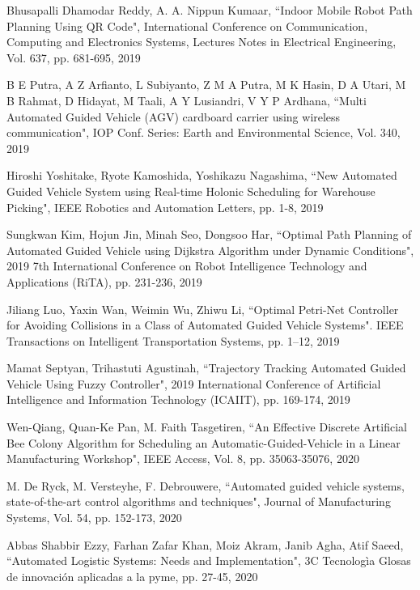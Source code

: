 \begin{thebibliography}{}
 Bhusapalli Dhamodar Reddy, A. A. Nippun Kumaar, ``Indoor Mobile Robot Path Planning Using QR Code", International Conference on Communication, Computing and Electronics Systems, Lectures Notes in Electrical Engineering, Vol. 637, pp. 681-695, 2019

 B E Putra, A Z Arfianto, L Subiyanto, Z M A Putra, M K Hasin, D A Utari, M B Rahmat, D Hidayat, M Taali, A Y Lusiandri, V Y P Ardhana, ``Multi Automated Guided Vehicle (AGV) cardboard carrier using wireless communication", IOP Conf. Series: Earth and Environmental Science, Vol. 340, 2019

 Hiroshi Yoshitake, Ryote Kamoshida, Yoshikazu Nagashima, ``New Automated Guided Vehicle System using Real-time Holonic Scheduling for Warehouse Picking", IEEE Robotics and Automation Letters, pp. 1-8, 2019

 Sungkwan Kim, Hojun Jin, Minah Seo, Dongsoo Har, ``Optimal Path Planning of Automated Guided Vehicle using Dijkstra Algorithm under Dynamic Conditions", 2019 7th International Conference on Robot Intelligence Technology and Applications (RiTA), pp. 231-236, 2019

 Jiliang Luo, Yaxin Wan, Weimin Wu, Zhiwu Li, ``Optimal Petri-Net Controller for Avoiding Collisions in a Class of Automated Guided Vehicle Systems". IEEE Transactions on Intelligent Transportation Systems, pp. 1–12, 2019

 Mamat Septyan, Trihastuti Agustinah, ``Trajectory Tracking Automated Guided Vehicle Using Fuzzy Controller", 2019 International Conference of Artificial Intelligence and Information Technology (ICAIIT), pp. 169-174, 2019


 Wen-Qiang, Quan-Ke Pan, M. Faith Tasgetiren, ``An Effective Discrete Artificial Bee Colony Algorithm for Scheduling an Automatic-Guided-Vehicle in a Linear Manufacturing Workshop", IEEE Access, Vol. 8, pp. 35063-35076, 2020

 M. De Ryck, M. Versteyhe, F. Debrouwere, ``Automated guided vehicle systems, state-of-the-art control algorithms and techniques", Journal of Manufacturing Systems, Vol. 54, pp. 152-173, 2020

 Abbas Shabbir Ezzy, Farhan Zafar Khan, Moiz Akram, Janib Agha,  Atif Saeed, ``Automated Logistic Systems: Needs and Implementation", 3C Tecnolog\`{i}a Glosas de innovaci\'{o}n aplicadas a la pyme, pp. 27-45, 2020


\end{thebibliography}
